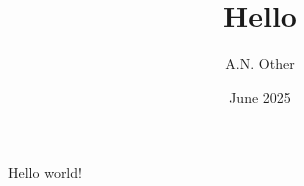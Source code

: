 \documentclass{article}
\title{Hello}
\author{A.N. Other}
\date{June 2025}
\begin{document}
   \maketitle
   Hello world!
\end{document}
